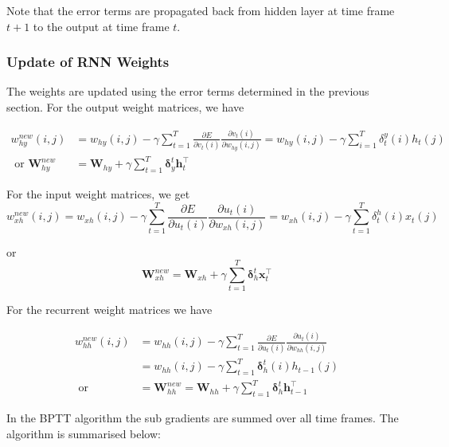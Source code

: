 Note that the error terms are propagated back from hidden layer at time frame $t + 1$ to the output at time frame $t$.

\subsubsection{Update of RNN Weights}
The weights are updated using the error terms determined in the previous section.  For the output weight matrices, we have 

\begin{equation}
\begin{aligned}w_{hy}^{new}(i,j)&=w_{hy}(i,j)-\gamma\sum_{t=1}^T\frac{\partial E}{\partial v_t(i)}\frac{\partial v_t(i)}{\partial w_{hy}(i,j)}=w_{hy}(i,j)-\gamma\sum_{i=1}^T\delta_t^y(i)h_t(j)\\ \text{ or }\mathbf{W}_{hy}^{new}&=\mathbf{W}_{hy}+\gamma\sum_{t=1}^T\mathbf{\delta}_y^t\mathbf{h}_t^\top\end{aligned} \label{eqn_c3_bptt10}\end{equation}

For the input weight matrices, we get \begin{equation}
w_{xh}^{new}(i,j)=w_{xh}(i,j)-\gamma\sum_{t=1}^T\frac{\partial E}{\partial u_t(i)}\frac{\partial u_t(i)}{\partial w_{xh}(i,j)}=w_{xh}(i,j)-\gamma\sum_{t=1}^T\delta_t^h(i)x_t(j) \label{eqn_c3_bptt11}\end{equation}

or 
\begin{equation}
\mathbf{W}_{xh}^{new}=\mathbf{W}_{xh}+\gamma\sum_{t=1}^T\mathbf{\delta}_h^t\mathbf{x}_t^\top \label{eqn_c3_bptt_13}\end{equation}

For the recurrent weight matrices we have 

\begin{equation} \begin{split}w_{hh}^{new}(i,j)&=w_{hh}(i,j)-\gamma\sum_{t=1}^T\frac{\partial E}{\partial u_t(i)}\frac{\partial u_t(i)}{\partial w_{hh}(i,j)}\\ &=w_{hh}(i,j)-\gamma\sum_{t=1}^T\mathbf{\delta}_h^t(i)h_{t-1}(j)\\ \text{ or }&=\mathbf{W}_{hh}^{new}=\mathbf{W}_{hh}+\gamma\sum_{t=1}^T\mathbf{\delta}_h^t\mathbf{h}_{t-1}^\top \end{split} \label{eqn_c3_bptt14}\end{equation}

In the BPTT algorithm the sub gradients are summed over all time frames. The algorithm is summarised below:

